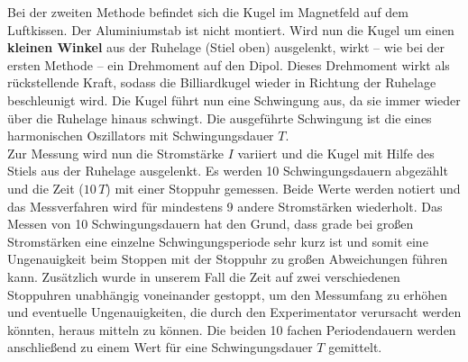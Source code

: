 Bei der zweiten Methode befindet sich die Kugel im Magnetfeld auf dem Luftkissen. Der Aluminiumstab ist nicht montiert. Wird nun die Kugel um einen \textbf{kleinen Winkel}
aus der Ruhelage (Stiel oben) ausgelenkt, wirkt -- wie bei der ersten Methode -- ein Drehmoment auf den Dipol. Dieses Drehmoment wirkt als rückstellende Kraft,
sodass die Billiardkugel wieder in Richtung der Ruhelage beschleunigt wird. Die Kugel führt nun eine Schwingung aus, da sie immer wieder über die Ruhelage hinaus schwingt.
Die ausgeführte Schwingung ist die eines harmonischen Oszillators mit Schwingungsdauer $T$. \\
Zur Messung wird nun die Stromstärke $I$ variiert und die Kugel mit Hilfe des Stiels aus der Ruhelage ausgelenkt. Es werden 10 Schwingungsdauern abgezählt und die Zeit ($10 \,T$) 
mit einer Stoppuhr gemessen. Beide Werte werden notiert und das Messverfahren wird für mindestens 9 andere Stromstärken wiederholt.
Das Messen von 10 Schwingungsdauern hat den Grund, dass grade bei großen Stromstärken eine einzelne Schwingungsperiode sehr kurz ist und somit eine Ungenauigkeit beim Stoppen
mit der Stoppuhr zu großen Abweichungen führen kann. Zusätzlich wurde in unserem Fall die Zeit auf zwei verschiedenen Stoppuhren unabhängig voneinander gestoppt, um den 
Messumfang zu erhöhen und eventuelle Ungenauigkeiten, die durch den Experimentator verursacht werden könnten, heraus mitteln zu können.
Die beiden 10 fachen Periodendauern werden anschließend zu einem Wert für eine Schwingungsdauer $T$ gemittelt. 